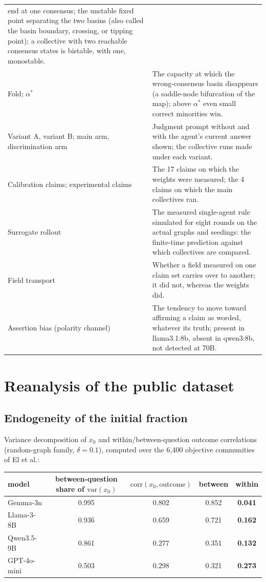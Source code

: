 \documentclass[11pt]{article}
\newcommand{\astar}{\alpha^{*}}
\begin{document}
\begin{table}[H]
\begin{tabular}{@{}>{\raggedright\arraybackslash}p{}p{}@{}}
end at one consensus; the unstable fixed point separating the two basins
(also called the basin boundary, crossing, or tipping point); a collective
with two reachable
consensus states is bistable, with one, monostable. \\
Fold; $\astar$ & The capacity at which the wrong-consensus basin disappears
(a saddle-node bifurcation of the map); above $\astar$ even small correct
minorities win. \\
Variant A, variant B; main arm, discrimination arm & Judgment prompt without
and with the agent's current answer shown; the collective runs made under
each variant. \\
Calibration claims; experimental claims & The 17 claims on which the weights
were measured; the 4 claims on which the main collectives ran. \\
Surrogate rollout & The measured single-agent rule simulated for eight
rounds on the actual graphs and seedings: the finite-time prediction
against which collectives are compared. \\
Field transport & Whether a field measured on one claim set carries over to
another; it did not, whereas the weights did. \\
Assertion bias (polarity channel) & The tendency to move toward affirming a
claim as worded, whatever its truth; present in llama3.1:8b, absent in
qwen3:8b, not detected at 70B. \\
\bottomrule
\end{tabular}
\end{table}

\section{Reanalysis of the public dataset}

\subsection{Endogeneity of the initial fraction}

Variance decomposition of $x_0$ and within/between-question outcome
correlations (random-graph family, $\delta = 0.1$), computed over the 6{,}400
objective communities of El et al.:

\begin{center}
\begin{tabular}{lcccc}
\toprule
model & between-question share of $\mathrm{var}(x_0)$ &
$\mathrm{corr}(x_0,\text{outcome})$ & between & \textbf{within} \\
\midrule
Gemma-3n     & 0.995 & 0.802 & 0.852 & \textbf{0.041} \\
Llama-3-8B   & 0.936 & 0.659 & 0.721 & \textbf{0.162} \\
Qwen3.5-9B   & 0.861 & 0.277 & 0.351 & \textbf{0.132} \\
GPT-4o-mini  & 0.503 & 0.298 & 0.321 & \textbf{0.273} \\
\bottomrule
\end{tabular}
\end{center}
\end{document}
